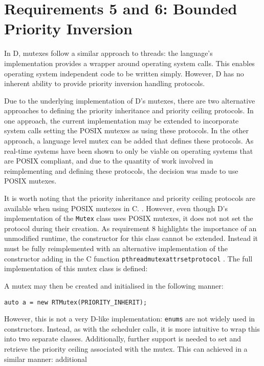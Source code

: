 \section{Requirements 5 and 6: Bounded Priority Inversion}
In D, mutexes follow a similar approach to threads: the language's
implementation provides a wrapper around operating system calls. This 
enables operating system independent code to be written simply. However, D has no 
inherent ability to provide priority inversion handling protocols. 
\par\bigskip\noindent
Due to the underlying implementation of D's mutexes, there are two alternative 
approaches to defining the priority inheritance and priority ceiling protocols.
In one approach, the current implementation may be extended to incorporate system calls 
setting the POSIX mutexes as using these protocols. In the other approach, a language level 
mutex can be added that defines these protocols. As real-time systems have been 
shown to only be viable on operating systems that are POSIX compliant, and due to 
the quantity of work involved in reimplementing and defining these protocols, the 
decision was made to use POSIX mutexes. 
\par\bigskip\noindent
It is worth noting that the priority inheritance and priority ceiling protocols 
are available when using POSIX mutexes in C. 
\cite{mutex-setprotocol}. However, even though D's implementation of the \texttt{Mutex} 
class uses POSIX mutexes, it does not not set the protocol during their creation. 
As requirement 8 highlights the importance of an unmodified runtime, the 
constructor for this class cannot be extended. Instead it must be fully 
reimplemented with an alternative implementation of the constructor adding in 
the C function \texttt{pthread\textunderscore{}mutexattr\textunderscore{}setprotocol} \cite{mutex-setprotocol}. 
The full implementation of this mutex class is defined:

A mutex may then be created and initialised in the following manner: 
\begin{lstlisting}
auto a = new RTMutex(PRIORITY_INHERIT);
\end{lstlisting}
However, this is not a very D-like implementation: \texttt{enums} are not widely used 
in constructors. Instead, as with the scheduler calls, 
it is more intuitive to wrap this into two separate classes. Additionally, 
further support 
is needed to set and retrieve the priority ceiling associated with the 
mutex. This can achieved in a similar manner: additional 
